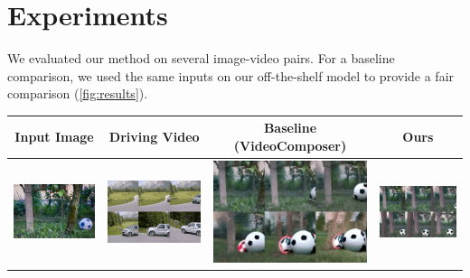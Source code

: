 \section{Experiments}

We evaluated our method on several image-video pairs. For a baseline comparison, we used the same inputs on our off-the-shelf model to provide a fair comparison (\cref{fig:results}).

\begin{table}[t]\centering
    \begin{tabular}{c|c|c|c}
        Input Image                                                 & Driving Video                                               & Baseline (VideoComposer)                                    & Ours                                                          \\ \midrule
        \includegraphics[width=0.23\linewidth]{media/ball/ii.jpg}   & \includegraphics[width=0.23\linewidth]{media/ball/dv.png}   & \includegraphics[width=0.23\linewidth]{media/ball/vc.png}   & \includegraphics[width=0.23\linewidth]{media/ball/ours.png}   \\

\end{tabular}
\end{table}

